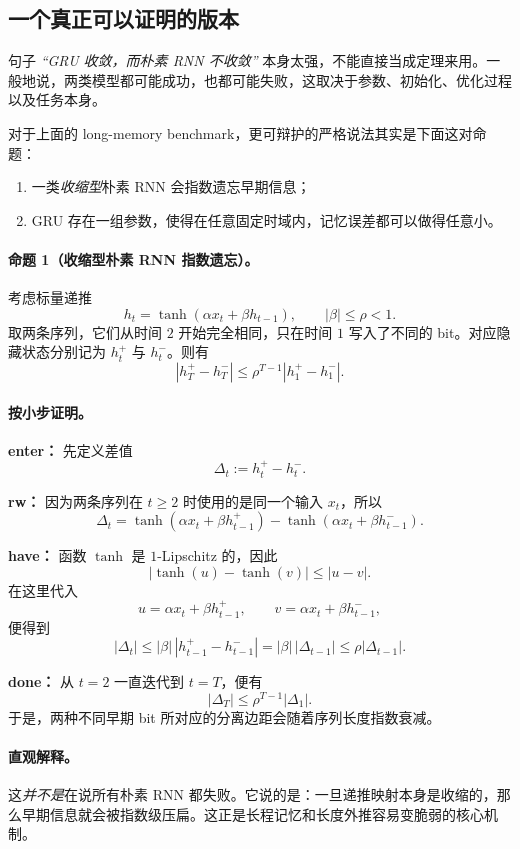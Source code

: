 \documentclass[12pt,a4paper]{ctexart}
\begin{document}
\subsection{一个真正可以证明的版本}

句子
\emph{“GRU 收敛，而朴素 RNN 不收敛”}
本身太强，不能直接当成定理来用。一般地说，两类模型都可能成功，也都可能失败，这取决于参数、初始化、优化过程以及任务本身。

对于上面的 long-memory benchmark，更可辩护的严格说法其实是下面这对命题：
\begin{enumerate}
  \item 一类\emph{收缩型}朴素 RNN 会指数遗忘早期信息；
  \item GRU 存在一组参数，使得在任意固定时域内，记忆误差都可以做得任意小。
\end{enumerate}

\paragraph{命题 1（收缩型朴素 RNN 指数遗忘）。}
考虑标量递推
\[
h_t = \tanh(\alpha x_t + \beta h_{t-1}),
\qquad |\beta| \le \rho < 1.
\]
取两条序列，它们从时间 \(2\) 开始完全相同，只在时间 \(1\) 写入了不同的 bit。对应隐藏状态分别记为 \(h_t^+\) 与 \(h_t^-\)。则有
\[
|h_T^+ - h_T^-|
\le
\rho^{T-1}|h_1^+ - h_1^-|.
\]

\paragraph{按小步证明。}
\textbf{enter：} 先定义差值
\[
\Delta_t := h_t^+ - h_t^-.
\]

\textbf{rw：} 因为两条序列在 \(t \ge 2\) 时使用的是同一个输入 \(x_t\)，所以
\[
\Delta_t
=
\tanh(\alpha x_t + \beta h_{t-1}^+)
-
\tanh(\alpha x_t + \beta h_{t-1}^-).
\]

\textbf{have：} 函数 \(\tanh\) 是 \(1\)-Lipschitz 的，因此
\[
|\tanh(u)-\tanh(v)| \le |u-v|.
\]
在这里代入
\[
u=\alpha x_t + \beta h_{t-1}^+,
\qquad
v=\alpha x_t + \beta h_{t-1}^-,
\]
便得到
\[
|\Delta_t|
\le
|\beta|\,|h_{t-1}^+ - h_{t-1}^-|
=
|\beta|\,|\Delta_{t-1}|
\le
\rho |\Delta_{t-1}|.
\]

\textbf{done：} 从 \(t=2\) 一直迭代到 \(t=T\)，便有
\[
|\Delta_T|
\le
\rho^{T-1}|\Delta_1|.
\]
于是，两种不同早期 bit 所对应的分离边距会随着序列长度指数衰减。

\paragraph{直观解释。}
这\emph{并不是}在说所有朴素 RNN 都失败。它说的是：一旦递推映射本身是收缩的，那么早期信息就会被指数级压扁。这正是长程记忆和长度外推容易变脆弱的核心机制。
\end{document}

